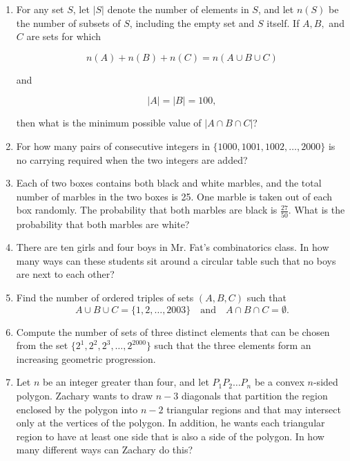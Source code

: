 \documentclass{article}
\theoremstyle{remark}
\begin{document}
\begin{enumerate}
        We see that $10b = (mk)b$ and $a = (mk)a$


        \item For any set \( S \), let \( |S| \) denote the number of elements in \( S \), and let \( n(S) \) be the number of subsets of \( S \), including the empty set and \( S \) itself. If \( A, B, \) and \( C \) are sets for which

        \[
        n(A) + n(B) + n(C) = n(A \cup B \cup C)
        \]
        
        and 
        
        \[
        |A| = |B| = 100,
        \]
        
        then what is the minimum possible value of \( |A \cap B \cap C| \)?

        \item For how many pairs of consecutive integers in $\{1000,1001,1002, \dots, 2000\}$
        is no carrying required when the two integers are added?

        \item Each of two boxes contains both black and white marbles, and the total number of marbles in the two boxes is 25. One marble is taken out of each box randomly. The probability that both marbles are black is \( \frac{27}{50} \). What is the probability that both marbles are white?

        \item There are ten girls and four boys in Mr. Fat’s combinatorics class. In how many ways can these students sit around a circular table such that no boys are next to each other?
        
        \item Find the number of ordered triples of sets \( (A,B,C) \) such that
        \[
        A \cup B \cup C = \{1,2,\dots,2003\} \quad \text{and} \quad A \cap B \cap C = \emptyset.
        \]
        
        \item Compute the number of sets of three distinct elements that can be chosen from the set \( \{2^1, 2^2, 2^3, \dots, 2^{2000}\} \) such that the three elements form an increasing geometric progression.
        
        \item Let \( n \) be an integer greater than four, and let \( P_1P_2 \dots P_n \) be a convex \( n \)-sided polygon. Zachary wants to draw \( n - 3 \) diagonals that partition the region enclosed by the polygon into \( n - 2 \) triangular regions and that may intersect only at the vertices of the polygon. In addition, he wants each triangular region to have at least one side that is also a side of the polygon. In how many different ways can Zachary do this?
        

\end{enumerate}
\end{document}
